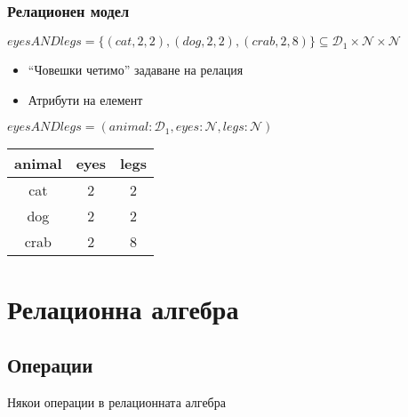 \documentclass{beamer}
\begin{document}
\begin{frame}[fragile]
\frametitle{Релационен модел}

$eyesANDlegs=\{(cat,2,2),(dog,2,2),(crab,2,8)\} \subseteq \mathcal{D}_1 \times \mathcal{N} \times \mathcal{N}$

\vspace{1em}

\begin{itemize}
  \item ``Човешки четимо'' задаване на релация
  \item Атрибути на елемент
\end{itemize}

\vspace{1em}

$eyesANDlegs=(animal:\mathcal{D}_1,eyes:\mathcal{N},legs:\mathcal{N})$

\pause


\begin{center}
  
\begin{tabular}{ c | c | c }
  
  animal  & eyes  & legs \\ \hline  
  cat  & 2  & 2 \\
  dog & 2 & 2 \\
  crab & 2 & 8 \\
  
\end{tabular} 

\end{center}


\end{frame}

\section{Релационна алгебра}
\subsection{Операции}


\begin{frame}
\centerline{Някои операции в релационната алгебра}
\end{frame}
\end{document}
